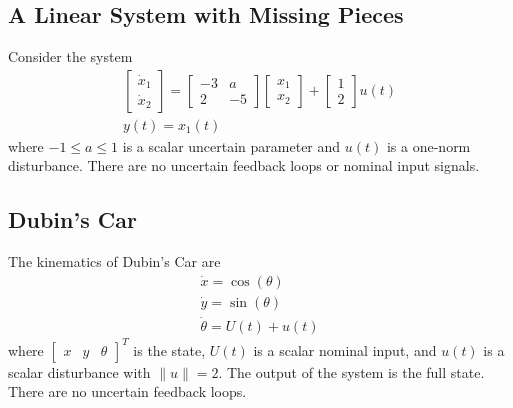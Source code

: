 \documentclass{article}
\begin{document}
\subsection{A Linear System with Missing Pieces}
Consider the system
\begin{gather*}
\begin{bmatrix} \dot{x}_1 \\ \dot{x}_2 \end{bmatrix} = 
	\begin{bmatrix} -3 & a \\ 2 & -5 \end{bmatrix}
	\begin{bmatrix} x_1 \\ x_2 \end{bmatrix} +
	\begin{bmatrix} 1 \\ 2 \end{bmatrix} u(t) \\
y(t) = x_1(t)
\end{gather*}
where $-1 \leq a \leq 1$ is a scalar uncertain parameter and $u(t)$ is a
one-norm disturbance. There are no uncertain feedback loops or nominal input
signals.




\subsection{Dubin's Car}
The kinematics of Dubin's Car are
\begin{gather*}
\dot{x} = \cos(\theta) \\
\dot{y} = \sin(\theta) \\
\dot{\theta} = U(t) + u(t)
\end{gather*}
where $\begin{bmatrix} x & y & \theta \end{bmatrix}^T$ is the state, $U(t)$ is a
scalar nominal input, and $u(t)$ is a scalar disturbance with $\|u\| = 2$. The
output of the system is the full state. There are no uncertain feedback loops.


\end{document}
